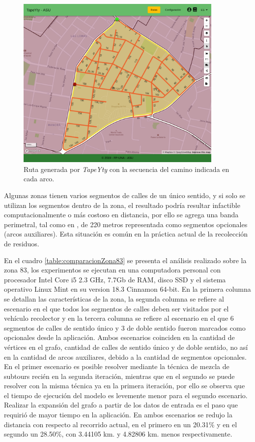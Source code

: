 \documentclass[spanish, conference]{IEEEtran}
\begin{document}
\begin{figure}[tbp]
\centerline{\includegraphics[width=0.9\textwidth]{imagenes/recorrido83ConOpcionales.png}}
\caption{Ruta generada por \textit{TapeYty} con la secuencia del camino indicada en cada arco.}
\label{fig:RecorridoTapeYtyZona83Opcionales}
\end{figure}

Algunas zonas tienen varios segmentos de calles de un único sentido, y si solo se utilizan los segmentos dentro de la zona, el resultado podría resultar infactible computacionalmente o más costoso en distancia, por ello se agrega una banda perimetral, tal como en \cite{Braier2017AnArgentina}, de 220 metros representada como segmentos opcionales (arcos auxiliares). Esta situación es común en la práctica actual de la recolección de residuos.

En el cuadro \ref{table:comparacionZona83} se presenta el análisis realizado sobre la zona 83, los experimentos se ejecutan en una computadora personal con procesador Intel\textcopyright{}  Core\texttrademark{} i5 2.3 GHz, 7.7Gb de RAM, disco SSD y el sistema operativo Linux Mint en su version 18.3 Cinnamon 64-bit. En la primera columna se detallan las características de la zona, la segunda columna se refiere al escenario en el que todos los segmentos de calles deben ser visitados por el vehículo recolector y en la tercera columna se refiere al escenario en el que 6 segmentos de calles de sentido único y 3 de doble sentido fueron marcados como opcionales desde la aplicación. Ambos escenarios coinciden en la cantidad de vértices en el grafo, cantidad de calles de sentido único y de doble sentido, no así en la cantidad de arcos auxiliares, debido a la cantidad de segmentos opcionales. En el primer escenario es posible resolver mediante la técnica de mezcla de subtours recién en la segunda iteración, mientras que en el segundo se puede resolver con la misma técnica ya en la primera iteración, por ello se observa que el tiempo de ejecución del modelo es levemente menor para el segundo escenario. Realizar la expansión del grafo a partir de los datos de entrada es el paso que requirió de mayor tiempo en la aplicación. En ambos escenarios se redujo la distancia con respecto al recorrido actual, en el primero en un 20.31\% y en el segundo un 28.50\%, con 3.44105 km. y 4.82806 km. menos respectivamente.
\end{document}
